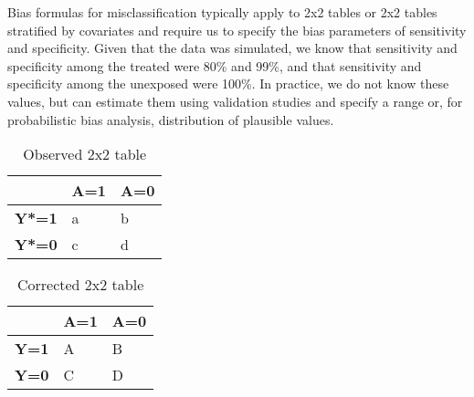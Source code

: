 \documentclass[
]{book}
\begin{document}
Bias formulas for misclassification typically apply to 2x2 tables or 2x2 tables stratified by covariates and require us to specify the bias parameters of sensitivity and specificity. Given that the data was simulated, we know that sensitivity and specificity among the treated were 80\% and 99\%, and that sensitivity and specificity among the unexposed were 100\%. In practice, we do not know these values, but can estimate them using validation studies and specify a range or, for probabilistic bias analysis, distribution of plausible values.

\begin{table}

\caption{\label{tab:unnamed-chunk-12}Observed 2x2 table}
\centering
\begin{tabular}[t]{>{}l|l|l}
\hline
 & A=1 & A=0\\
\hline
\textbf{Y*=1} & a & b\\
\hline
\textbf{Y*=0} & c & d\\
\hline
\end{tabular}
\end{table}

\begin{table}

\caption{\label{tab:unnamed-chunk-13}Corrected 2x2 table}
\centering
\begin{tabular}[t]{>{}l|l|l}
\hline
 & A=1 & A=0\\
\hline
\textbf{Y=1} & A & B\\
\hline
\textbf{Y=0} & C & D\\
\hline
\end{tabular}
\end{table}
\end{document}
